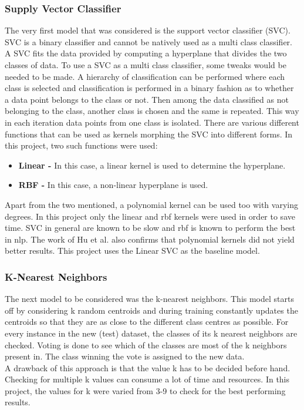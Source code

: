 \documentclass[11pt,a4paper]{article}
\begin{document}
\subsubsection{Supply Vector Classifier}
\label{svc}
The very first model that was considered is the support vector classifier (SVC). SVC is a binary classifier and cannot be natively used as a multi class classifier. A SVC fits the data provided by computing a hyperplane that divides the two classes of data. To use a SVC as a multi class classifier, some tweaks would be needed to be made. A hierarchy of classification can be performed where each class is selected and classification is performed in a binary fashion as to whether a data point belongs to the class or not. Then among the data classified as not belonging to the class, another class is chosen and the same is repeated. This way in each iteration data points from one class is isolated. There are various different functions that can be used as kernels morphing the SVC into different forms. In this project, two such functions were used:
\begin{itemize}
  \item \textbf{Linear - } In this case, a linear kernel is used to determine the hyperplane.
  \item \textbf{RBF - } In this case, a non-linear hyperplane is used.
\end{itemize}
Apart from the two mentioned, a polynomial kernel can be used too with varying degrees. In this project only the linear and rbf kernels were used in order to save time. SVC in general are known to be slow and rbf is known to perform the best in nlp. The work of Hu et al. \cite{hu2009lyric} also confirms that polynomial kernels did not yield better results. This project uses the Linear SVC as the baseline model.

\subsubsection{K-Nearest Neighbors}
\label{knn}
The next model to be considered was the k-nearest neighbors. This model starts off by considering k random centroids and during training constantly updates the centroids so that they are as close to the different class centres as possible. For every instance in the new (test) dataset, the classes of its k nearest neighbors are checked. Voting is done to see which of the classes are most of the k neighbors present in. The class winning the vote is assigned to the new data.\\
A drawback of this approach is that the value k has to be decided before hand. Checking for multiple k values can consume a lot of time and resources. In this project, the values for k were varied from 3-9 to check for the best performing results.
\end{document}
